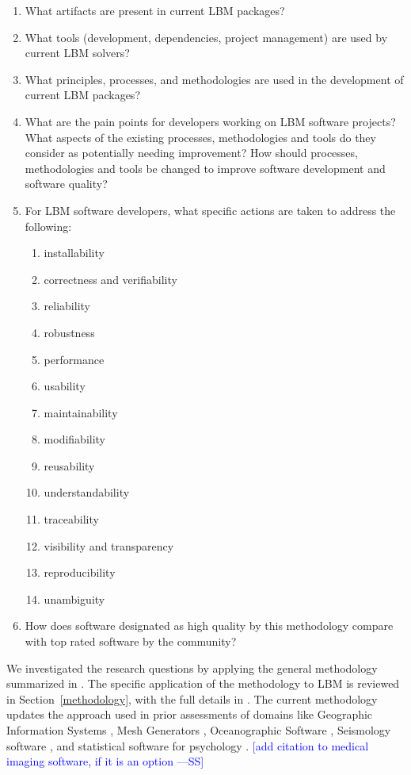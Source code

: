 \documentclass[final, 3p, times, authoryear]{elsarticle}
\newcommand{\authornote}[3]{\textcolor{#1}{[#3 ---#2]}}
\newcommand{\authornote}[3]{}
\newcommand{\wss}[1]{\authornote{blue}{SS}{#1}} %
\begin{document}
\begin{enumerate}
	\item What artifacts are present in current LBM packages? 
	\item What tools (development, dependencies, project management) are used by
	current LBM solvers?
	\item What principles, processes, and methodologies are used in the development
	of current LBM packages?
	\item What are the pain points for developers working on LBM software
	projects?  What aspects of the existing processes, methodologies and tools do
	they consider as potentially needing improvement?  How should processes,
	methodologies and tools be changed to improve software development and
	software quality?
	\item For LBM software developers, what specific actions are taken to
	address the following:
	\begin{enumerate}
		\item installability
		\item correctness and verifiability
		\item reliability
		\item robustness
		\item performance
		\item usability
		\item maintainability
		\item modifiability
		\item reusability
		\item understandability
		\item traceability
		\item visibility and transparency
		\item reproducibility
		\item unambiguity
	\end{enumerate} 
	\item How does software designated as high quality by this methodology
	compare	with top rated software by the community?
\end{enumerate}

We investigated the research questions by applying the general methodology
summarized in \citet{SmithEtAl2021}.  The specific application of the
methodology to LBM is reviewed in Section~\ref{methodology}, with the full
details in \citep{Michalski2021}.  The current methodology updates the approach
used in prior assessments of domains like Geographic Information Systems
\citep{SmithEtAl2018_arXivGIS}, Mesh Generators \citep{SmithEtAl2016},
Oceanographic Software \citep{smith2015state}, Seismology software
\citep{SmithEtAl2018}, and statistical software for psychology
\citep{SmithEtAl2018_StatSoft}.  \wss{add citation to medical imaging software,
if it is an option}
\end{document}
